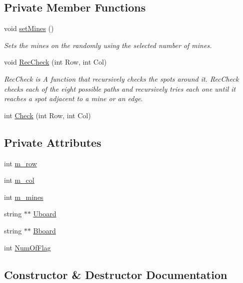 \subsection*{Private Member Functions}
\begin{DoxyCompactItemize}
\item 
void \hyperlink{classMinesweeper_a3150b5ddb8317214df23b2836ef12f50}{set\+Mines} ()
\begin{DoxyCompactList}\small\item\em Sets the mines on the randomly using the selected number of mines. \end{DoxyCompactList}\item 
void \hyperlink{classMinesweeper_ac86d9717b1312d79e6cd9d56e258a7e6}{Rec\+Check} (int Row, int Col)
\begin{DoxyCompactList}\small\item\em Rec\+Check is A function that recursively checks the spots around it. Rec\+Check checks each of the eight possible paths and recursively tries each one until it reaches a spot adjacent to a mine or an edge. \end{DoxyCompactList}\item 
int \hyperlink{classMinesweeper_a2c4f9e490db8fda6bef5cd5c532c49e5}{Check} (int Row, int Col)
\end{DoxyCompactItemize}
\subsection*{Private Attributes}
\begin{DoxyCompactItemize}
\item 
int \hyperlink{classMinesweeper_a47b1d8996740c300ba320a207833f3ff}{m\+\_\+row}
\item 
int \hyperlink{classMinesweeper_a1a42dbff44098fe674d172907ff0a224}{m\+\_\+col}
\item 
int \hyperlink{classMinesweeper_aa20d1458dce4ca9a3accd312df2e882e}{m\+\_\+mines}
\item 
string $\ast$$\ast$ \hyperlink{classMinesweeper_ac8e42ed2ff1dccc35d9a9529ffafe9a4}{Uboard}
\item 
string $\ast$$\ast$ \hyperlink{classMinesweeper_aa990cf0cf6d3ffe348e93b0b176db90f}{Bboard}
\item 
int \hyperlink{classMinesweeper_aa11ba428693510b67f95979f6762b8c6}{Num\+Of\+Flag}
\end{DoxyCompactItemize}


\subsection{Constructor \& Destructor Documentation}
\mbox{\label{classMinesweeper_a9cb58f108f5f65317c5f7d60ead4e7ec}} 
